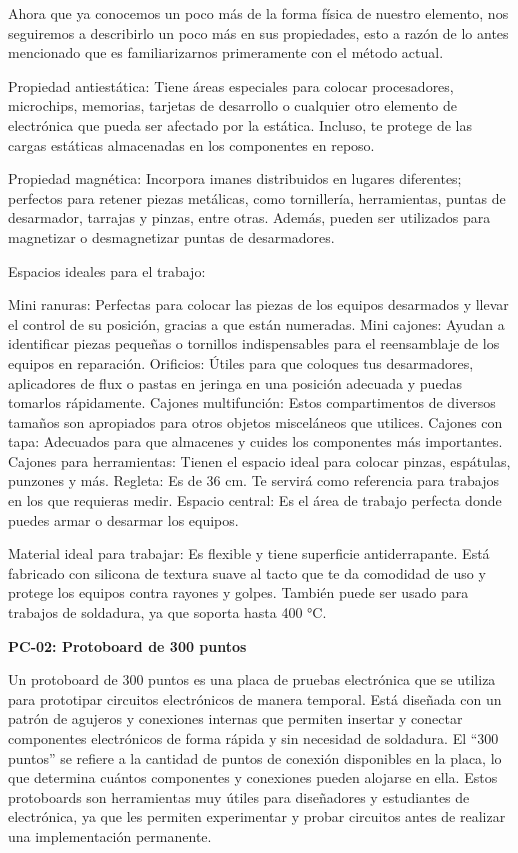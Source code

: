     Ahora que ya conocemos un poco más de la forma física de nuestro elemento, nos seguiremos a describirlo un poco más en sus propiedades, esto a razón de lo antes mencionado que es familiarizarnos primeramente con el método actual.
    
    Propiedad antiestática: Tiene áreas especiales para colocar procesadores, microchips, memorias, tarjetas de desarrollo o cualquier otro elemento de electrónica que pueda ser afectado por la estática. Incluso, te protege de las cargas estáticas almacenadas en los componentes en reposo.
    
    
    Propiedad magnética: Incorpora imanes distribuidos en lugares diferentes; perfectos para retener piezas metálicas, como tornillería, herramientas, puntas de desarmador, tarrajas y pinzas, entre otras. Además, pueden ser utilizados para magnetizar o desmagnetizar puntas de desarmadores.
    
    
    Espacios ideales para el trabajo:
    
    Mini ranuras: Perfectas para colocar las piezas de los equipos desarmados y llevar el control de su posición, gracias a que están numeradas.
    Mini cajones: Ayudan a identificar piezas pequeñas o tornillos indispensables para el reensamblaje de los equipos en reparación.
    Orificios: Útiles para que coloques tus desarmadores, aplicadores de flux o pastas en jeringa en una posición adecuada y puedas tomarlos rápidamente.
    Cajones multifunción: Estos compartimentos de diversos tamaños son apropiados para otros objetos misceláneos que utilices.
    Cajones con tapa: Adecuados para que almacenes y cuides los componentes más importantes.
    Cajones para herramientas: Tienen el espacio ideal para colocar pinzas, espátulas, punzones y más.
    Regleta: Es de 36 cm. Te servirá como referencia para trabajos en los que requieras medir.
    Espacio central: Es el área de trabajo perfecta donde puedes armar o desarmar los equipos.
    
    Material ideal para trabajar: Es flexible y tiene superficie antiderrapante. Está fabricado con silicona de textura suave al tacto que te da comodidad de uso y protege los equipos contra rayones y golpes. También puede ser usado para trabajos de soldadura, ya que soporta hasta 400 °C.
    
    
    
    \textbf{PC-02: Protoboard de 300 puntos}
    
    Un protoboard de 300 puntos es una placa de pruebas electrónica que se utiliza para prototipar circuitos electrónicos de manera temporal. Está diseñada con un patrón de agujeros y conexiones internas que permiten insertar y conectar componentes electrónicos de forma rápida y sin necesidad de soldadura. El “300 puntos” se refiere a la cantidad de puntos de conexión disponibles en la placa, lo que determina cuántos componentes y conexiones pueden alojarse en ella. Estos protoboards son herramientas muy útiles para diseñadores y estudiantes de electrónica, ya que les permiten experimentar y probar circuitos antes de realizar una implementación permanente.
    
